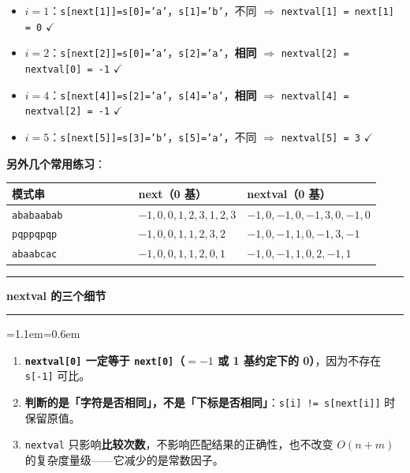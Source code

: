 \documentclass[11pt,openany,UTF8]{ctexbook}
\newcommand{\callouthead}[2]{%
  \par\addvspace{7pt}\noindent
  {\color{#1}\rule[-0.15em]{3pt}{1.05em}}\hspace{0.5em}%
  {\bfseries\color{#1}#2}\par\nobreak\vspace{-0.35em}%
  {\color{rulesep}\hrule height 0.4pt}\nobreak\vspace{0.45em}%
  \begingroup\small\setlength{\parindent}{0pt}%
  \leftskip=1.1em\rightskip=0.6em\noindent\ignorespaces}
\newcommand{\calloutend}{\par\endgroup\addvspace{7pt}}
\newenvironment{callwarn}[1]{\callouthead{warnbar}{#1}}{\calloutend}
\begin{document}
\begin{itemize}
\item $i=1$：\texttt{s[next[1]\allowbreak{}]\allowbreak{}=\allowbreak{}s[0]\allowbreak{}=\allowbreak{}'a'}，\texttt{s[1]\allowbreak{}=\allowbreak{}'b'}，不同 $\Rightarrow$ \texttt{nextval[1]\allowbreak{} =\allowbreak{} next[1]\allowbreak{} =\allowbreak{} 0} $\checkmark$
\item $i=2$：\texttt{s[next[2]\allowbreak{}]\allowbreak{}=\allowbreak{}s[0]\allowbreak{}=\allowbreak{}'a'}，\texttt{s[2]\allowbreak{}=\allowbreak{}'a'}，\textbf{相同} $\Rightarrow$ \texttt{nextval[2]\allowbreak{} =\allowbreak{} nextval[0]\allowbreak{} =\allowbreak{} -1} $\checkmark$
\item $i=4$：\texttt{s[next[4]\allowbreak{}]\allowbreak{}=\allowbreak{}s[2]\allowbreak{}=\allowbreak{}'a'}，\texttt{s[4]\allowbreak{}=\allowbreak{}'a'}，\textbf{相同} $\Rightarrow$ \texttt{nextval[4]\allowbreak{} =\allowbreak{} nextval[2]\allowbreak{} =\allowbreak{} -1} $\checkmark$
\item $i=5$：\texttt{s[next[5]\allowbreak{}]\allowbreak{}=\allowbreak{}s[3]\allowbreak{}=\allowbreak{}'b'}，\texttt{s[5]\allowbreak{}=\allowbreak{}'a'}，不同 $\Rightarrow$ \texttt{nextval[5]\allowbreak{} =\allowbreak{} 3} $\checkmark$
\end{itemize}
\textbf{另外几个常用练习}：

\begingroup\small\setlength{\tabcolsep}{4.0pt}
\begin{longtable}{@{}L{0.4333\linewidth}L{0.2476\linewidth}L{0.2476\linewidth}@{}}
\toprule
\textbf{模式串} & \textbf{next（0 基）} & \textbf{nextval（0 基）} \\
\midrule
\endhead
\texttt{ababaabab} & $-1,0,0,1,2,3,1,2,3$ & $-1,0,-1,0,-1,3,0,-1,0$ \\
\texttt{pqppqpqp} & $-1,0,0,1,1,2,3,2$ & $-1,0,-1,1,0,-1,3,-1$ \\
\texttt{abaabcac} & $-1,0,0,1,1,2,0,1$ & $-1,0,-1,1,0,2,-1,1$ \\
\bottomrule
\end{longtable}
\endgroup

\begin{callwarn}{nextval 的三个细节}
\begin{enumerate}
\item \textbf{\texttt{nextval[0]\allowbreak{}} 一定等于 \texttt{next[0]\allowbreak{}}（$= -1$ 或 1 基约定下的 0）}，因为不存在 \texttt{s[-1]\allowbreak{}} 可比。
\item \textbf{判断的是「字符是否相同」，不是「下标是否相同」}：\texttt{s[i]\allowbreak{} !=\allowbreak{} s[next[i]\allowbreak{}]\allowbreak{}} 时保留原值。
\item \texttt{nextval} 只影响\textbf{比较次数}，不影响匹配结果的正确性，也不改变 $O(n+m)$ 的复杂度量级——它减少的是常数因子。
\end{enumerate}
\end{callwarn}
\end{document}
